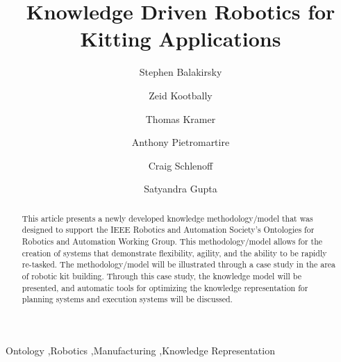 \documentclass[preprint,12pt]{elsarticle}
\begin{document}
\begin{frontmatter}



\title{Knowledge Driven Robotics for Kitting Applications}


\author[NIST]{Stephen Balakirsky}
\author[NIST,UMD]{Zeid Kootbally}
\author[CATHU,NIST]{Thomas Kramer}
\author[NIST]{Anthony Pietromartire}
\author[NIST]{Craig Schlenoff}
\author[UMD]{Satyandra Gupta}

\address[CATHU]{Catholic University of America, Washington, DC, USA}
\address[NIST]{National Institute of Standards and Technology, Gaithersburg, MD USA}
\address[UMD]{University of Maryland, College Park, MD, USA}

\begin{abstract}
This article presents a newly developed knowledge methodology/model that was designed to support 
the IEEE Robotics and Automation Society's Ontologies for Robotics and Automation Working Group. 
This methodology/model allows for the creation of systems that 
demonstrate flexibility, agility, and the ability to be rapidly re-tasked. 
The methodology/model will be illustrated through a case study in the area of robotic kit building.
Through this case study, the knowledge model will be presented, and automatic
tools for optimizing the knowledge representation for planning systems and execution
systems will be discussed.
\end{abstract}

\begin{keyword}
Ontology \sep Robotics \sep Manufacturing \sep Knowledge Representation


\end{keyword}

\end{frontmatter}
\end{document}
